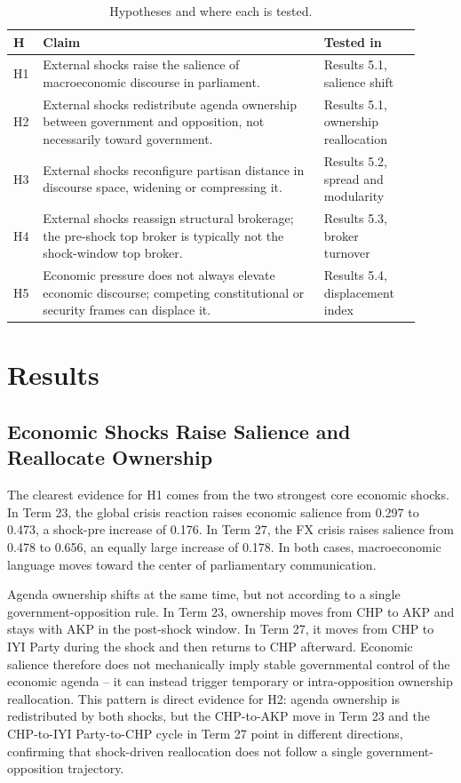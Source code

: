 \documentclass[11pt]{article}
\begin{document}
\begin{table}[htbp]
\centering
\caption{Hypotheses and where each is tested.}
\label{tab:hypotheses}
\small
\begin{tabular}{p{0.05\linewidth} p{0.64\linewidth} p{0.22\linewidth}}
\toprule
\textbf{H} & \textbf{Claim} & \textbf{Tested in} \\
\midrule
H1 & External shocks raise the salience of macroeconomic discourse in parliament. & Results 5.1, salience shift \\
H2 & External shocks redistribute agenda ownership between government and opposition, not necessarily toward government. & Results 5.1, ownership reallocation \\
H3 & External shocks reconfigure partisan distance in discourse space, widening or compressing it. & Results 5.2, spread and modularity \\
H4 & External shocks reassign structural brokerage; the pre-shock top broker is typically not the shock-window top broker. & Results 5.3, broker turnover \\
H5 & Economic pressure does not always elevate economic discourse; competing constitutional or security frames can displace it. & Results 5.4, displacement index \\
\bottomrule
\end{tabular}
\end{table}

\section{Results}
\subsection{Economic Shocks Raise Salience and Reallocate Ownership}
The clearest evidence for H1 comes from the two strongest core economic shocks. In Term 23, the global crisis reaction raises economic salience from 0.297 to 0.473, a shock-pre increase of 0.176. In Term 27, the FX crisis raises salience from 0.478 to 0.656, an equally large increase of 0.178. In both cases, macroeconomic language moves toward the center of parliamentary communication.

Agenda ownership shifts at the same time, but not according to a single government-opposition rule. In Term 23, ownership moves from CHP to AKP and stays with AKP in the post-shock window. In Term 27, it moves from CHP to IYI Party during the shock and then returns to CHP afterward. Economic salience therefore does not mechanically imply stable governmental control of the economic agenda -- it can instead trigger temporary or intra-opposition ownership reallocation. This pattern is direct evidence for H2: agenda ownership is redistributed by both shocks, but the CHP-to-AKP move in Term 23 and the CHP-to-IYI Party-to-CHP cycle in Term 27 point in different directions, confirming that shock-driven reallocation does not follow a single government-opposition trajectory.
\end{document}
